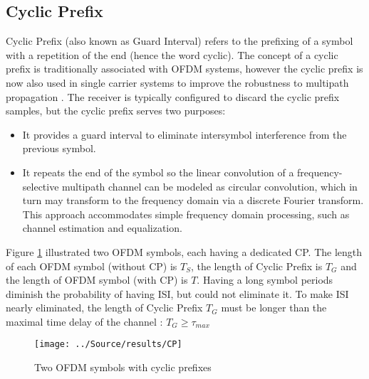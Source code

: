 \subsection{Cyclic Prefix}
Cyclic Prefix (also known as Guard Interval) refers to the prefixing of a symbol with a repetition of the end (hence the word cyclic). The concept of a cyclic prefix is traditionally associated with OFDM systems, however the cyclic prefix is now also used in single carrier systems to improve the robustness to multipath propagation \cite{CP}. The receiver is typically configured to discard the cyclic prefix samples, but the cyclic prefix serves two purposes:
\begin{itemize}
    \item It provides a guard interval to eliminate intersymbol interference from the previous symbol.
    \item It repeats the end of the symbol so the linear convolution of a frequency-selective multipath channel can be modeled as circular convolution, which in turn may transform to the frequency domain via a discrete Fourier transform. This approach accommodates simple frequency domain processing, such as channel estimation and equalization.
\end{itemize}
Figure \ref{fig:cp} illustrated two OFDM symbols, each having a dedicated CP. The length of each OFDM symbol (without CP) is $T_S$, the length of Cyclic Prefix is $T_G$ and the length of OFDM symbol (with CP) is $T$. Having a long symbol periods diminish the probability of having ISI, but could not eliminate it. To make ISI nearly eliminated, the length of Cyclic Prefix $T_G$ must be longer than the maximal time delay of the channel : $T_G \geq \tau_{max}$
\begin{figure}[htbp]
    \centering
    \texttt{[image: ../Source/results/CP]}
    \caption{Two OFDM symbols with cyclic prefixes}
    \label{fig:cp}
\end{figure}



